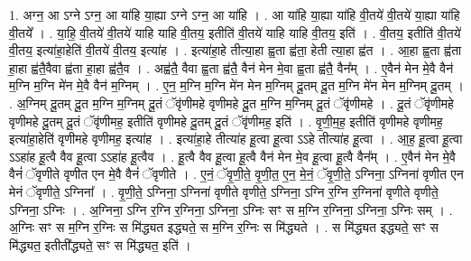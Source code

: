 \documentclass[17pt]{extarticle}
\begin{document}
1. अग्न॒ आ ऽग्ने ऽग्न॒ आ या॑हि या॒ह्या ऽग्ने ऽग्न॒ आ या॑हि । . आ या॑हि या॒ह्या या॑हि वी॒तये॑ वी॒तये॑ या॒ह्या या॑हि वी॒तये᳚ । . या॒हि॒ वी॒तये॑ वी॒तये॑ याहि याहि वी॒तय॒ इतीति॑ वी॒तये॑ याहि याहि वी॒तय॒ इति॑ । . वी॒तय॒ इतीति॑ वी॒तये॑ वी॒तय॒ इत्या॑हा॒हेति॑ वी॒तये॑ वी॒तय॒ इत्या॑ह । . इत्या॑हा॒हे तीत्या॒हा ह्व॒ता ह्व॑ता॒ हेती त्या॒हा ह्व॑त । . आ॒हा ह्व॒ता ह्व॑ता हा॒हा ह्व॑तै॒वैवा ह्व॑ता हा॒हा ह्व॑तै॒व । . अह्व॑तै॒ वैवा ह्व॒ता ह्व॑तै॒ वैन॑ मेन मे॒वा ह्व॒ता ह्व॑तै॒ वैन᳚म् । . ए॒वैन॑ मेन मे॒वै वैन॑ म॒ग्नि म॒ग्नि मे॑न मे॒वै वैन॑ म॒ग्निम् । . ए॒न॒ म॒ग्नि म॒ग्नि मे॑न मेन म॒ग्निम् दू॒तम् दू॒त म॒ग्नि मे॑न मेन म॒ग्निम् दू॒तम् । . अ॒ग्निम् दू॒तम् दू॒त म॒ग्नि म॒ग्निम् दू॒तं ॅवृ॑णीमहे वृणीमहे दू॒त म॒ग्नि म॒ग्निम् दू॒तं ॅवृ॑णीमहे । . दू॒तं ॅवृ॑णीमहे वृणीमहे दू॒तम् दू॒तं ॅवृ॑णीमह॒ इतीति॑ वृणीमहे दू॒तम् दू॒तं ॅवृ॑णीमह॒ इति॑ । . वृ॒णी॒म॒ह॒ इतीति॑ वृणीमहे वृणीमह॒ इत्या॑हा॒हेति॑ वृणीमहे वृणीमह॒ इत्या॑ह । . इत्या॑हा॒हे तीत्या॑ह हू॒त्वा हू॒त्वा ऽऽहे तीत्या॑ह हू॒त्वा । . आ॒ह॒ हू॒त्वा हू॒त्वा ऽऽहा॑ह हू॒त्वै वैव हू॒त्वा ऽऽहा॑ह हू॒त्वैव । . हू॒त्वै वैव हू॒त्वा हू॒त्वै वैन॑ मेन मे॒व हू॒त्वा हू॒त्वै वैन᳚म् । . ए॒वैन॑ मेन मे॒वै वैनं॑ ॅवृणीते वृणीत एन मे॒वै वैनं॑ ॅवृणीते । . ए॒नं॒ ॅवृ॒णी॒ते॒ वृ॒णी॒त॒ ए॒न॒ मे॒नं॒ ॅवृ॒णी॒ते॒ ऽग्निना॒ ऽग्निना॑ वृणीत एन मेनं ॅवृणीते॒ ऽग्निना᳚ । . वृ॒णी॒ते॒ ऽग्निना॒ ऽग्निना॑ वृणीते वृणीते॒ ऽग्निना॒ ऽग्नि र॒ग्नि र॒ग्निना॑ वृणीते वृणीते॒ ऽग्निना॒ ऽग्निः । . अ॒ग्निना॒ ऽग्नि र॒ग्नि र॒ग्निना॒ ऽग्निना॒ ऽग्निः सꣳ स म॒ग्नि र॒ग्निना॒ ऽग्निना॒ ऽग्निः सम् । . अ॒ग्निः सꣳ स म॒ग्नि र॒ग्निः स मि॑द्ध्यत इद्ध्यते॒ स म॒ग्नि र॒ग्निः स मि॑द्ध्यते । . स मि॑द्ध्यत इद्ध्यते॒ सꣳ स मि॑द्ध्यत॒ इतीती᳚द्ध्यते॒ सꣳ स मि॑द्ध्यत॒ इति॑ । \newline
\end{document}
